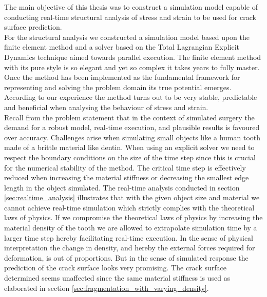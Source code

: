 
The main objective of this thesis was to construct a simulation model
capable of conducting real-time structural analysis of stress and
strain to be used for crack surface prediction. \\

%
For the structural analysis we constructed a simulation model based upon
the finite element method and a solver based on the Total Lagrangian
Explicit Dynamics technique aimed towards parallel execution. 
%
The finite element method with its pure style is so elegant and
yet so complex it takes years to fully master.
Once the method has been implemented as the fundamental framework for
representing and solving the problem domain its true potential emerges. 
According to our experience the method turns out to be very
stable, predictable and beneficial when analysing the behaviour of stress
and strain. \\

% 
Recall from the problem statement that in the context of simulated
surgery the demand for a robust model, real-time execution, and
plausible results is favoured over accuracy.
%
Challenges arise when simulating small objects like a human tooth
made of a brittle material like dentin. 
%
When using an explicit solver we need to respect the boundary
conditions on the size of the time step since this is crucial for the
numerical stability of the method.
%
The critical time step is effectively reduced when increasing the
material stiffness or decreasing the smallest edge 
length in the object simulated.
%
The real-time analysis conducted in section
\vref{sec:realtime_analysis} illustrates that with the given
object size and material we cannot achieve real-time simulation which
strictly complies with the theoretical laws of physics.
If we compromise the
theoretical laws of physics by increasing the material density of the tooth we
are allowed to extrapolate simulation time by a larger time step hereby
facilitating real-time execution. In the sense of physical
interpretation the change in density, and hereby the external forces
required for deformation, is out of proportions. But in the sense of 
simulated response the prediction of the crack surface looks very
promising. The crack surface determined seems unaffected since the
same material stiffness is used as elaborated in 
section \vref{sec:fragmentation_with_varying_density}. \\

